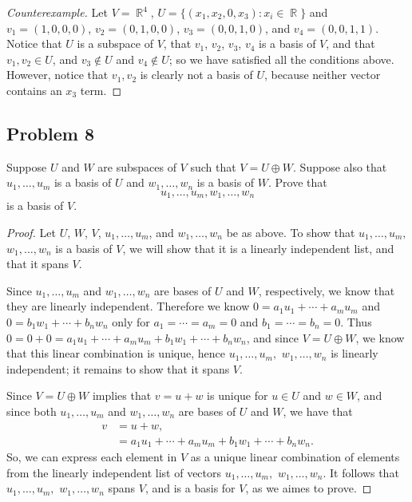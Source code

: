\documentclass[letterpaper, 12pt]{amsart}
\DeclareMathOperator{\R}{\mathbb{R}}				%
\theoremstyle{definition}  							%
\begin{document}
		\begin{proof}[Counterexample]
		Let $V = \R^{4}$, $U = \{ (x_{1}, x_{2}, 0, x_{3}) : x_{i} \in \R \}$ and $v_{1} = (1,0,0,0)$, $v_{2} = (0,1,0,0)$, $v_{3} = (0,0,1,0)$, and $v_{4} = (0,0,1,1)$.
		Notice that $U$ is a subspace of $V$, that $v_{1}$, $v_{2}$, $v_{3}$, $v_{4}$ is a basis of $V$, and that $v_{1}, v_{2} \in U$, and $v_{3} \notin U$ and $v_{4} \notin U$; so we have satisfied all the conditions above.
		However, notice that $v_{1}, v_{2}$ is clearly not a basis of $U$, because neither vector contains an $x_{3}$ term.
		\end{proof}

		\subsection*{Problem 8}
		Suppose $U$ and $W$ are subspaces of $V$ such that $V = U \oplus W$. 
		Suppose also that $u_{1}, \dots, u_{m}$ is a basis of $U$ and $w_{1}, \dots, w_{n}$ is a basis of $W$. 
		Prove that $$ u_{1}, \dots, u_{m}, w_{1}, \dots, w_{n} $$ is a basis of $V$.

		\begin{proof}
		Let $U$, $W$, $V$, $u_{1}, \dots, u_{m}$, and $w_{1}, \dots, w_{n}$ be as above.
		To show that $u_{1}, \dots, u_{m},$ $w_{1}, \dots, w_{n}$ is a basis of $V$, we will show that it is a linearly independent list, and that it spans $V$.

		Since $u_{1}, \dots, u_{m}$ and $w_{1}, \dots, w_{n}$ are bases of $U$ and $W$, respectively, we know that they are linearly independent.
		Therefore we know $0 = a_{1}u_{1} + \cdots + a_{m}u_{m}$ and $0 = b_{1}w_{1} + \cdots + b_{n}w_{n}$ only for $a_{1} = \cdots = a_{m} = 0$ and $b_{1} = \cdots = b_{n} = 0$.
		Thus $0 = 0 + 0 = a_{1}u_{1} + \cdots + a_{m}u_{m} + b_{1}w_{1} + \cdots + b_{n}w_{n}$, and since $V = U \oplus W$, we know that this linear combination is unique, hence $u_{1}, \dots, u_{m},$ $w_{1}, \dots, w_{n}$ is linearly independent; it remains to show that it spans $V$.

		Since $V = U \oplus W$ implies that $v = u + w$ is unique for $u \in U$ and $w \in W$, and since both $u_{1}, \dots, u_{m}$ and $w_{1}, \dots, w_{n}$ are bases of $U$ and $W$, we have that 
			\begin{align*}
				v &= u + w, \\
				&= a_{1}u_{1} + \cdots + a_{m}u_{m} + b_{1}w_{1} + \cdots + b_{n}w_{n}.
			\end{align*}
		So, we can express each element in $V$ as a unique linear combination of elements from the linearly independent list of vectors $u_{1}, \dots, u_{m},$ $w_{1}, \dots, w_{n}$.
		It follows that $u_{1}, \dots, u_{m},$ $w_{1}, \dots, w_{n}$ spans $V$, and is a basis for $V$, as we aimes to prove.
		\end{proof}
\end{document}
